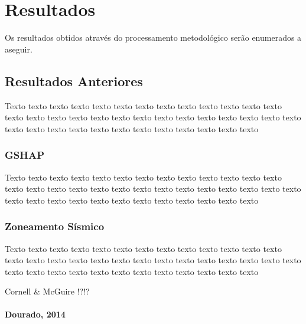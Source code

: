 \chapter{Resultados}
\label{cap:resultados}

Os resultados obtidos através do processamento metodológico serão enumerados a
aseguir.


\section{Resultados Anteriores}
\label{sec:fundamentos}

Texto texto texto texto texto texto texto texto texto texto texto texto texto
texto texto texto texto texto texto texto texto texto texto texto texto texto
texto texto texto texto texto texto texto texto texto texto texto texto texto


\subsection{GSHAP}
\label{sec:fundamentos}

Texto texto texto texto texto texto texto texto texto texto texto texto texto
texto texto texto texto texto texto texto texto texto texto texto texto texto
texto texto texto texto texto texto texto texto texto texto texto texto texto



\subsection{Zoneamento Sísmico}
\label{sec:fundamentos}

Texto texto texto texto texto texto texto texto texto texto texto texto texto
texto texto texto texto texto texto texto texto texto texto texto texto texto
texto texto texto texto texto texto texto texto texto texto texto texto texto

Cornell & McGuire !?!?


\subsubsection{Dourado, 2014}
\label{sec:fundamentos}


